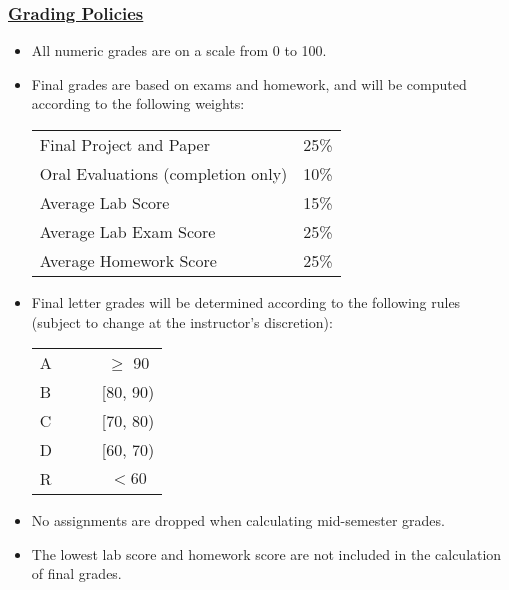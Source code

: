 \documentclass[11pt]{article}
\begin{document}
\subsubsection*{\underline{Grading Policies}}
\begin{itemize}
\item All numeric grades are on a scale from 0 to 100.
\item Final grades are based on exams and homework, and will be computed according to the following weights:
\begin{center}
\begin{tabular}{lr}
Final Project and Paper    			& 25\%\\
Oral Evaluations (completion only)  			& 10\%\\
Average Lab Score & 15\%\\
Average Lab Exam Score  			& 25\%\\
Average Homework Score 			& 25\%\\
\end{tabular}
\end{center}
\item Final letter grades will be determined according to the following rules (subject to change at the instructor's discretion):
\begin{center}
\begin{tabular}{lcc}
A  	& $\;\;\;\;$		& $\geq$ 90\\
B  	& $\;\;\;\;$		& [80, 90)\\
C  & $\;\;\;\;$	 & [70, 80)\\
D  & $\;\;\;\;$	 & [60, 70)\\
R  & $\;\;\;\;$	 & $< 60$\\
\end{tabular}
\end{center}

\item {No assignments are dropped when calculating mid-semester grades.}  

\item {The lowest lab score and homework score are not included in the calculation of final grades.}    

\end{itemize}
\end{document}
